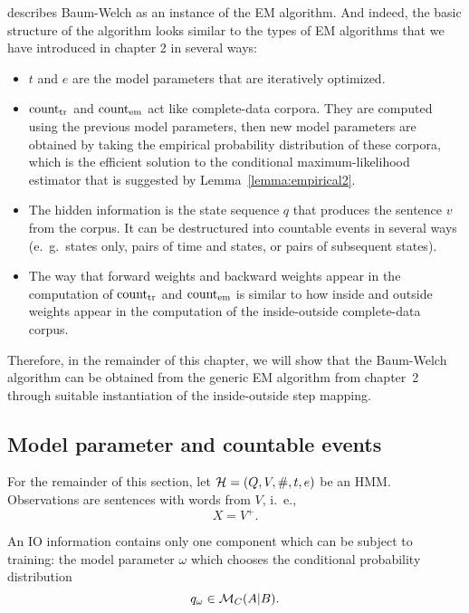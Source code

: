 \cite{jm09} describes Baum-Welch as an instance of the EM algorithm. And
indeed, the basic structure of the algorithm looks similar to the types of EM
algorithms that we have introduced in chapter 2 in several ways:
\begin{itemize}
 \item $t$ and $e$ are the model parameters that are iteratively optimized.
 \item $\operatorname{count}_\mathrm{tr}$ and $\operatorname{count}_\mathrm{em}$ act like complete-data
  corpora. They are computed using the previous model parameters, then new
  model parameters are obtained by taking the empirical probability
  distribution of these corpora, which is the efficient solution to the
  conditional maximum-likelihood estimator that is suggested by
  Lemma~\ref{lemma:empirical2}.
 \item The hidden information is the state sequence $q$ that produces the
  sentence $v$ from the corpus. It can be destructured into countable events in
  several ways (e.~g.~states only, pairs of time and states, or pairs of
  subsequent states).
 \item The way that forward weights and backward weights appear in the
  computation of $\operatorname{count}_\mathrm{tr}$ and $\operatorname{count}_\mathrm{em}$ is similar to how
  inside and outside weights appear in the computation of the inside-outside
  complete-data corpus.
\end{itemize}

Therefore, in the remainder of this chapter, we will show that the Baum-Welch
algorithm can be obtained from the generic EM algorithm from chapter~2 through
suitable instantiation of the inside-outside step mapping.

\subsection{Model parameter and countable events}

For the remainder of this section, let $\mathcal H = (Q,V,\#,t,e)$ be an HMM.
Observations are sentences with words from $V$, i.~e.,
\[
 X = V^+.
\]

An IO information contains only one component which can be subject to training:
the model parameter $\omega$ which chooses the conditional probability
distribution
\[
 q_\omega \in \mathcal M_C(A|B).
\]

